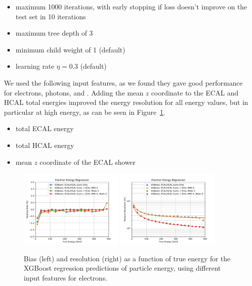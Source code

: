 \begin{itemize}
\item maximum 1000 iterations, with early stopping if loss doesn't improve on the test set in 10 iterations
\item maximum tree depth of 3
\item minimum child weight of 1 (default)
\item learning rate $\eta = 0.3$ (default)
\end{itemize}

We used the following input features, as we found they gave good performance for electrons, photons, and \pizero. Adding the mean $z$ coordinate to the ECAL and HCAL total energies improved the energy resolution for all energy values, but in particular at high energy, as can be seen in Figure~\ref{fig:reg_xgb_ecalmoms}.

\begin{itemize}
\item total ECAL energy
\item total HCAL energy
\item mean $z$ coordinate of the ECAL shower
\end{itemize}

\begin{figure}[htbp]
\centering
\includegraphics[width=0.45\textwidth]{Images/Calo/bias_vs_E_EleFixed_xgb_ecalmoms_zoom.pdf}
\includegraphics[width=0.45\textwidth]{Images/Calo/res_vs_E_EleFixed_xgb_ecalmoms_fits.pdf}
\caption{Bias (left) and resolution (right) as a function of true energy for the XGBoost regression predictions of particle energy, using different input features for electrons.\label{fig:reg_xgb_ecalmoms}}
\end{figure}

